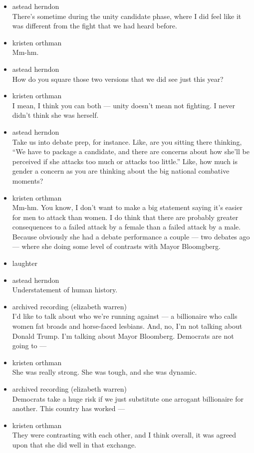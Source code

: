 \begin{itemize}
\item
  astead herndon\\
  There's sometime during the unity candidate phase, where I did feel
  like it was different from the fight that we had heard before.
\item
  kristen orthman\\
  Mm-hm.
\item
  astead herndon\\
  How do you square those two versions that we did see just this year?
\item
  kristen orthman\\
  I mean, I think you can both --- unity doesn't mean not fighting. I
  never didn't think she was herself.
\item
  astead herndon\\
  Take us into debate prep, for instance. Like, are you sitting there
  thinking, ``We have to package a candidate, and there are concerns
  about how she'll be perceived if she attacks too much or attacks too
  little.'' Like, how much is gender a concern as you are thinking about
  the big national combative moments?
\item
  kristen orthman\\
  Mm-hm. You know, I don't want to make a big statement saying it's
  easier for men to attack than women. I do think that there are
  probably greater consequences to a failed attack by a female than a
  failed attack by a male. Because obviously she had a debate
  performance a couple --- two debates ago --- where she doing some
  level of contrasts with Mayor Bloomgberg.
\item
  laughter
\item
  astead herndon\\
  Understatement of human history.
\item
  archived recording (elizabeth warren)\\
  I'd like to talk about who we're running against --- a billionaire who
  calls women fat broads and horse-faced lesbians. And, no, I'm not
  talking about Donald Trump. I'm talking about Mayor Bloomberg.
  Democrats are not going to ---
\item
  kristen orthman\\
  She was really strong. She was tough, and she was dynamic.
\item
  archived recording (elizabeth warren)\\
  Democrats take a huge risk if we just substitute one arrogant
  billionaire for another. This country has worked ---
\item
  kristen orthman\\
  They were contrasting with each other, and I think overall, it was
  agreed upon that she did well in that exchange.
\end{itemize}

